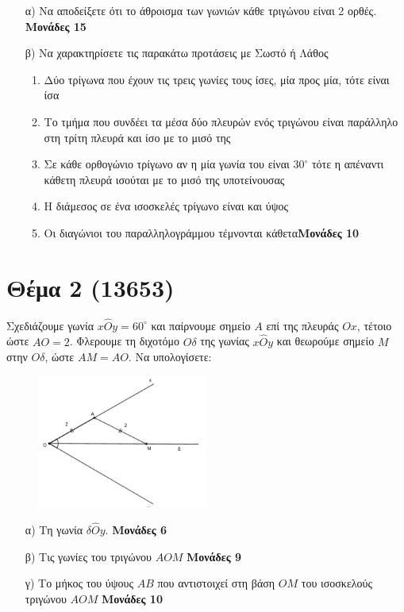 \documentclass[12pt]{extarticle}
\begin{document}
\begin{enumerate}
    \item[α)] Να αποδείξετε ότι το άθροισμα των γωνιών κάθε τριγώνου είναι 2 ορθές. \hspace*{\fill} \textbf{Μονάδες 15}

    \item[β)] Να χαρακτηρίσετε τις παρακάτω προτάσεις με Σωστό ή Λάθος
        \begin{enumerate}
            \item Δύο τρίγωνα που έχουν τις τρεις γωνίες τους ίσες, μία προς μία, τότε είναι ίσα
            \item Το τμήμα που συνδέει τα μέσα δύο πλευρών ενός τριγώνου είναι παράλληλο στη τρίτη πλευρά και ίσο με το μισό της
            \item Σε κάθε ορθογώνιο τρίγωνο αν η μία γωνία του είναι $30^{\circ}$ τότε η απέναντι κάθετη πλευρά ισούται με το μισό της υποτείνουσας
            \item Η διάμεσος σε ένα ισοσκελές τρίγωνο είναι και ύψος
            \item Οι διαγώνιοι του παραλληλογράμμου τέμνονται κάθετα\hspace*{\fill}\textbf{Μονάδες 10}
        \end{enumerate}
\end{enumerate}

\section*{Θέμα 2 (13653)}
\noindent
Σχεδιάζουμε γωνία $x\hat{O}y=60^{\circ}$ και παίρνουμε σημείο $Α$ επί της πλευράς $Ox$, τέτοιο ώστε $ΑΟ=2$. Φλερουμε τη διχοτόμο $Οδ$ της γωνίας $x\hat{O}y$ και θεωρούμε σημείο $Μ$ στην $Οδ$, ώστε $ΑΜ=ΑΟ$. Να υπολογίσετε:
\begin{figure}[h]
    \centering
    \includegraphics[width=0.50\textwidth]{2023_2}
\end{figure}
\begin{enumerate}
    \item[α)] Τη γωνία $δ\hat{Ο}y$. \hspace*{\fill} \textbf{Μονάδες 6}
    \item[β)] Τις γωνίες του τριγώνου $ΑΟΜ$ \hspace*{\fill} \textbf{Μονάδες 9}
    \item[γ)] Το μήκος του ύψους $ΑΒ$ που αντιστοιχεί στη βάση $ΟΜ$ του ισοσκελούς τριγώνου $ΑΟΜ$ \hspace*{\fill} \textbf{Μονάδες 10}
\end{enumerate}
\end{document}
